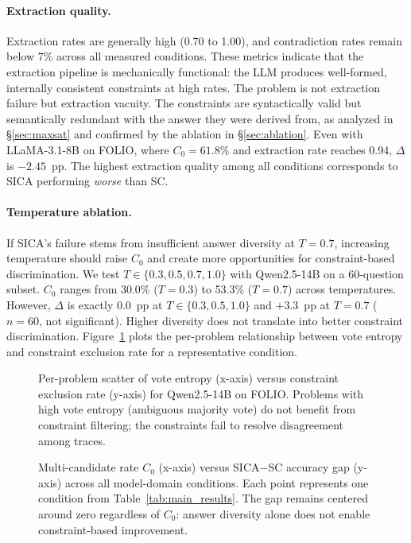 \paragraph{Extraction quality.} Extraction rates are generally high (0.70 to 1.00), and contradiction rates remain below 7\% across all measured conditions. These metrics indicate that the extraction pipeline is mechanically functional: the LLM produces well-formed, internally consistent constraints at high rates. The problem is not extraction failure but extraction vacuity. The constraints are syntactically valid but semantically redundant with the answer they were derived from, as analyzed in \S\ref{sec:maxsat} and confirmed by the ablation in \S\ref{sec:ablation}. Even with LLaMA-3.1-8B on FOLIO, where $C_0 = 61.8\%$ and extraction rate reaches 0.94, $\Delta$ is $-2.45$~pp. The highest extraction quality among all conditions corresponds to SICA performing \emph{worse} than SC.

\paragraph{Temperature ablation.} If SICA's failure stems from insufficient answer diversity at $T = 0.7$, increasing temperature should raise $C_0$ and create more opportunities for constraint-based discrimination. We test $T \in \{0.3, 0.5, 0.7, 1.0\}$ with Qwen2.5-14B on a 60-question subset. $C_0$ ranges from 30.0\% ($T=0.3$) to 53.3\% ($T=0.7$) across temperatures. However, $\Delta$ is exactly 0.0~pp at $T \in \{0.3, 0.5, 1.0\}$ and $+3.3$~pp at $T = 0.7$ ($n = 60$, not significant). Higher diversity does not translate into better constraint discrimination. Figure~\ref{fig:capability_scatter} plots the per-problem relationship between vote entropy and constraint exclusion rate for a representative condition.

\begin{figure}[t]
\centering
\caption{Per-problem scatter of vote entropy (x-axis) versus constraint exclusion rate (y-axis) for Qwen2.5-14B on FOLIO. Problems with high vote entropy (ambiguous majority vote) do not benefit from constraint filtering; the constraints fail to resolve disagreement among traces.}
\label{fig:capability_scatter}
\end{figure}

\begin{figure}[t]
\centering
\caption{Multi-candidate rate $C_0$ (x-axis) versus SICA$-$SC accuracy gap (y-axis) across all model-domain conditions. Each point represents one condition from Table~\ref{tab:main_results}. The gap remains centered around zero regardless of $C_0$: answer diversity alone does not enable constraint-based improvement.}
\label{fig:operating_regime}
\end{figure}

